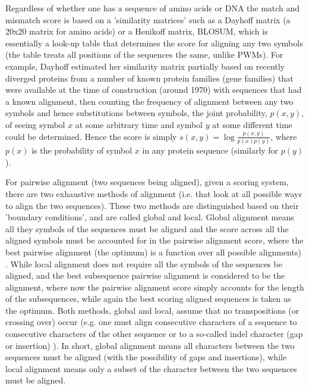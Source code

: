 Regardless of whether one has a sequence of amino acids or DNA the match and mismatch score is based on a 'similarity matrices' such as a Dayhoff matrix (a 20x20 matrix for amino acids) or a Henikoff matrix, BLOSUM, which is essentially a look-up table that determines the score for aligning any two symbols (the table treats all positions of the sequences the same, unlike PWMs).  For example, Dayhoff estimated her similarity matrix partially based on recently diverged proteins from a number of known protein families (gene families) that were available at the time of construction (around 1970) with sequences that had a known alignment, then counting the frequency of alignment between any two symbols and hence substitutions between symbols, the joint probability, $p(x,y)$, of seeing symbol $x$ at some arbitrary time and symbol $y$ at some different time could be determined.  Hence the score is simply $s(x,y)=\log{\frac{p(x,y)}{p(x)p(y)}}$, where $p(x)$ is the probability of symbol $x$ in any protein sequence (similarly for $p(y)$).      	
	
	For pairwise alignment (two sequences being aligned), given a scoring system, there are two exhaustive methods of alignment (i.e. that look at all possible ways to align the two sequences).  These two methods are distinguished based on their 'boundary conditions', and are called global and local.  Global alignment means all they symbols of the sequences must be aligned and the score across all the aligned symbols must be accounted for in the pairwise alignment score, where the best pairwise alignment (the optimum) is a function over all possible alignments) .  While local alignment does not require all the symbols of the sequences be aligned, and the best subsequence pairwise alignment is considered to be the alignment, where now the pairwise alignment score simply accounts for the length of the subsequences, while again the best scoring aligned sequences is taken as the optimum.  Both methods, global and local, assume that no transpositions (or crossing over) occur (e.g. one must align consecutive characters of a sequence to consecutive characters of the other sequence or to a so-called indel character (gap or insertion) ). In short, global alignment means all characters between the two sequences must be aligned (with the possibility of gaps and insertions), while local alignment means only a subset of the character between the two sequences must be aligned.
	
